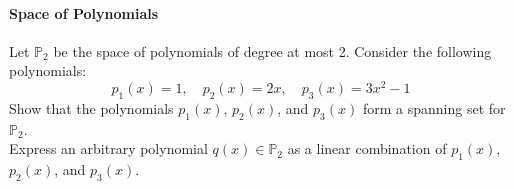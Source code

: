 \documentclass[]{article}
\begin{document}
	\paragraph{Space of Polynomials}
	Let $\mathbb{P}_2$ be the space of polynomials of degree at most 2.
	Consider the following polynomials:
	$$p_1(x) = 1, \quad p_2(x) = 2x, \quad p_3(x) = 3x^2 - 1$$
	Show that the polynomials $p_1(x)$, $p_2(x)$, and $p_3(x)$ form a spanning set for $\mathbb{P}_2$.\\
	Express an arbitrary polynomial $q(x) \in \mathbb{P}_2$ as a linear combination of $p_1(x)$, $p_2(x)$, and $p_3(x)$.
	
\end{document}
